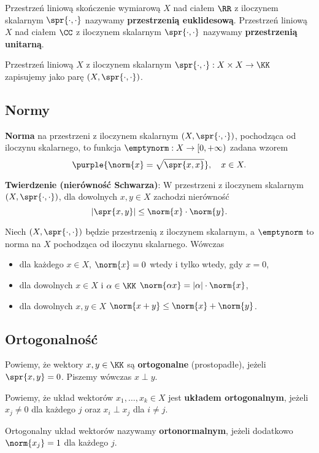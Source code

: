 Przestrzeń liniową skończenie wymiarową $X$ nad ciałem $\RR$ z iloczynem skalarnym $\spr{\cdot,\cdot}$ nazywamy \textbf{przestrzenią euklidesową}. Przestrzeń liniową $X$ nad ciałem $\CC$ z iloczynem skalarnym  $\spr{\cdot,\cdot}$ nazywamy \textbf{przestrzenią unitarną}.

Przestrzeń liniową $X$ z iloczynem skalarnym $\spr{\cdot,\cdot}: X\times X\to\KK$ zapisujemy jako parę $(X,\spr{\cdot,\cdot})$.

\subsection{Normy}

\textbf{Norma} na przestrzeni z iloczynem skalarnym $(X,\spr{\cdot,\cdot})$, pochodząca od iloczynu skalarnego, to funkcja $\emptynorm:X\to[0,+\infty)$ zadana wzorem
$$
\purple{\norm{x} = \sqrt{\spr{x,x}}}, \quad x\in X.
$$

\textbf{Twierdzenie (nierówność Schwarza)}:
W przestrzeni z iloczynem skalarnym $(X,\spr{\cdot,\cdot})$, dla dowolnych $x,y\in X$ zachodzi nierówność
$$
|\spr{x,y}| \leq \norm{x} \cdot \norm{y}.
$$

Niech $(X,\spr{\cdot,\cdot})$ będzie przestrzenią z iloczynem skalarnym, a $\emptynorm$ to norma na $X$ pochodząca od iloczynu skalarnego. Wówczas
\begin{itemize}
    \item dla każdego $x\in X$, $\norm{x}=0$ wtedy i tylko wtedy, gdy $x=0$,
    \item dla dowolnych $x\in X$ i $\alpha\in\KK$ $\norm{\alpha x} = |\alpha|\cdot\norm{x}$,
    \item dla dowolnych $x,y\in X$ $\norm{x+y}\leq\norm{x}+\norm{y}$.
\end{itemize}

\subsection{Ortogonalność}

Powiemy, że wektory $x,y\in\KK$ są \textbf{ortogonalne} (prostopadłe), jeżeli $\spr{x,y}=0$. Piszemy wówczas $x\perp y$.

Powiemy, że układ wektorów $x_1,\ldots,x_k\in X$ jest \textbf{układem ortogonalnym}, jeżeli $x_j\neq0$ dla każdego $j$ oraz $x_i\perp x_j$ dla $i\neq j$.

Ortogonalny układ wektorów nazywamy \textbf{ortonormalnym}, jeżeli dodatkowo $\norm{x_j}=1$ dla każdego $j$.

